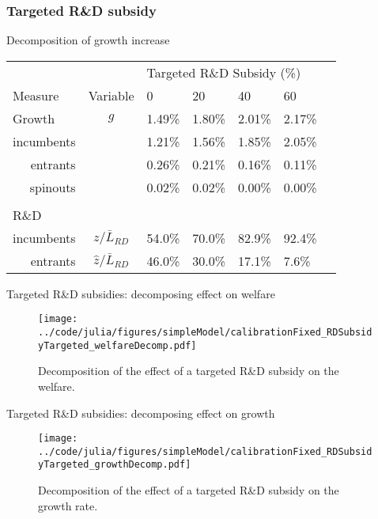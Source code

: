 \documentclass[english,usenames,dvipsnames]{beamer}
\begin{document}
\subsubsection{Targeted R\&D subsidy}

\begin{frame}{Decomposition of growth increase}\label{oi_rd_subsidies:decomposition_growth_decrease}
	\hyperlink{OI_RDsubsidy_table}{}
	\begin{table}
		\centering
		\small
		\begin{tabular}{lclllll}
			\toprule \toprule
			&  & \multicolumn{4}{l}{Targeted R\&D Subsidy (\%)} \vspace{3pt} \tabularnewline
			Measure & Variable & 0 & 20 & 40 & 60 \tabularnewline
			\midrule
			Growth & $g$ & 1.49\% & 1.80\% & 2.01\% & 2.17\% \tabularnewline
			\multicolumn{1}{r}{\quad incumbents} & & 1.21\% & 1.56\% & 1.85\% & 2.05\% \tabularnewline
			\multicolumn{1}{r}{\quad entrants} & & 0.26\% & 0.21\% & 0.16\% & 0.11\% \tabularnewline
			\multicolumn{1}{r}{\quad spinouts} &  & 0.02\% & 0.02\% & 0.00\% & 0.00\% \tabularnewline
			\tabularnewline
			R\&D & &  &  &  & \tabularnewline
			\multicolumn{1}{r}{\quad incumbents} & $z / \bar{L}_{RD}$ & 54.0\% & 70.0\% & 82.9\% & 92.4\% \tabularnewline
			\multicolumn{1}{r}{\quad entrants} & $\hat{z} / \bar{L}_{RD}$ & 46.0\% & 30.0\% & 17.1\% & 7.6\% \tabularnewline
			\bottomrule
		\end{tabular}
	\end{table}
\end{frame}

\begin{frame}{Targeted R\&D subsidies: decomposing effect on welfare} \label{plots:oi_rd_subsidies1} 
	\hyperlink{OI_RDsubsidy_table}{}
	\begin{figure}[]
		\texttt{[image: ../code/julia/figures/simpleModel/calibrationFixed\_RDSubsidyTargeted\_welfareDecomp.pdf]}
		\caption{Decomposition of the effect of a targeted R\&D subsidy on the welfare.}
		\label{calibration_OI_RDSubsidy_welfareDecomp}
	\end{figure}
\end{frame}

\begin{frame}{Targeted R\&D subsidies: decomposing effect on growth} \label{plots:oi_rd_subsidies2}
	\hyperlink{OI_RDsubsidy_table}{}
	\begin{figure}[]
		\texttt{[image: ../code/julia/figures/simpleModel/calibrationFixed\_RDSubsidyTargeted\_growthDecomp.pdf]}
		\caption{Decomposition of the effect of a targeted R\&D subsidy on the growth rate.}
		\label{calibration_OI_RDSubsidy_growthDecomp}
	\end{figure}
\end{frame}
\end{document}
